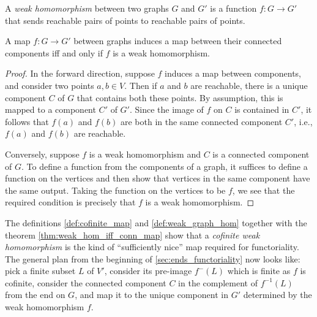 \begin{definition}
  \label{def:weak_graph_hom}
  A \emph{weak homomorphism} between two graphs $G$ and $G'$ is a function $f : G \to G'$ that sends reachable pairs of points to reachable pairs of points.
\end{definition}

\begin{theorem}
  \label{thm:weak_hom_iff_conn_map}
  A map $f : G \to G'$ between graphs induces a map between their connected components iff and only if $f$ is a weak homomorphism.
\end{theorem}

\begin{proof}
In the forward direction, suppose $f$ induces a map between components, and consider two points $a, b \in V$. Then if $a$ and $b$ are reachable, there is a unique component $C$ of $G$ that contains both these points. By assumption, this is mapped to a component $C'$ of $G'$. Since the image of $f$ on $C$ is contained in $C'$, it follows that $f(a)$ and $f(b)$ are both in the same connected component $C'$, i.e., $f(a)$ and $f(b)$ are reachable.

Conversely, suppose $f$ is a weak homomorphism and $C$ is a connected component of $G$. To define a function from the components of a graph, it suffices to define a function on the vertices and then show that vertices in the same component have the same output. Taking the function on the vertices to be $f$, we see that the required condition is precisely that $f$ is a weak homomorphism.
\end{proof}

The definitions \ref{def:cofinite_map} and \ref{def:weak_graph_hom} together with the theorem \ref{thm:weak_hom_iff_conn_map} show that a \emph{cofinite weak homomorphism} is the kind of ``sufficiently nice'' map required for functoriality. The general plan from the beginning of \ref{sec:ends_functoriality} now looks like:
pick a finite subset $L$ of $V'$, consider its pre-image $f^{-}(L)$ which is finite as $f$ is cofinite, consider the connected component $C$ in the complement of $f^{-1}(L)$ from the end on $G$, and map it to the unique component in $G'$ determined by the weak homomorphism $f$.
